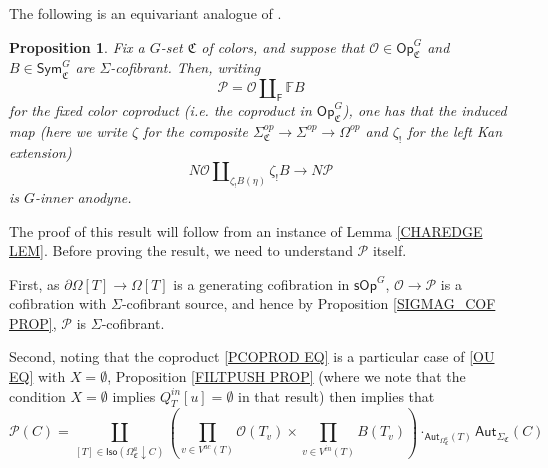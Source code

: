 \documentclass[a4paper,10pt
,draft
]{article}%
\numberwithin{equation}{section}
\numberwithin{figure}{section}
\newtheorem{proposition}[equation]{Proposition}%
\theoremstyle{definition} %
\newcommand{\Op}{\mathsf{Op}}%
\newcommand{\sOp}{\ensuremath{\mathsf{sOp}}}%
\renewcommand{\O}{\ensuremath{\mathcal O}}
\renewcommand{\P}{\ensuremath{\mathcal P}}
\newcommand{\1}{\ensuremath{\mathbbm 1}}%
\begin{document}
The following is an equivariant analogue of \cite[Prop. 3.2]{CM13b}.

\begin{proposition}\label{KEYPR PROP}
	Fix a $G$-set $\mathfrak{C}$ of colors,
	and suppose that 
	$\mathcal{O} \in \mathsf{Op}^{G}_{\mathfrak{C}}$
	and
	$B \in \mathsf{Sym}^{G}_{\mathfrak{C}}$
	are
	$\Sigma$-cofibrant.
	Then, writing
	\begin{equation}\label{PCOPROD EQ}
	\mathcal{P} = \mathcal{O} \amalg_{\mathsf{F}} \mathbb{F} B
	\end{equation}
	for the fixed color coproduct (i.e. the coproduct in $\Op^{G}_{ \mathfrak C}$),
	one has that the induced map
	(here we write $\zeta$ for the composite
	$\Sigma_{\mathfrak{C}}^{op} \to \Sigma^{op} \to \Omega^{op}$
	and $\zeta_!$ for the left Kan extension)
	\begin{equation}\label{ANODYNEMAP EQ}
	N \mathcal{O} \amalg_{\zeta_!B (\eta)} \zeta_!B \to N \mathcal{P}
	\end{equation}
	is $G$-inner anodyne.
%
\end{proposition}


The proof of this result will follow from an instance of 
Lemma \ref{CHAREDGE LEM}. 
Before proving the result, we need to understand $\mathcal{P}$ itself.

First, as $\partial \Omega[T] \to \Omega[T]$ is a generating cofibration in $\sOp^G$,
$\O \to \P$ is a cofibration with $\Sigma$-cofibrant source, and hence by Proposition \ref{SIGMAG_COF PROP},
$\P$ is $\Sigma$-cofibrant.

Second, noting that the coproduct \eqref{PCOPROD EQ}
is a particular case of \eqref{OU EQ} with $X=\emptyset$,
Proposition \ref{FILTPUSH PROP}
(where we note that the condition $X=\emptyset$ implies
$Q^{in}_T[u] = \emptyset$ in that result)
then implies that  
\begin{equation}\label{PUSHOPPR EQ}
\mathcal{P}(C) = 
\coprod_{
	[T] \in \mathsf{Iso}
	\left( \Omega_{\mathfrak{C}}^a \downarrow C \right)
}
\left(
\prod_{v \in V^{ac}(T)} \mathcal{O}(T_v)
\times
\prod_{v \in V^{in}(T)} B(T_v)
\right)
\cdot_{\mathsf{Aut}_{\Omega^a_{\mathfrak{C}}}(T)} \mathsf{Aut}_{\Sigma_{\mathfrak{C}}}(C)
\end{equation}
\end{document}
